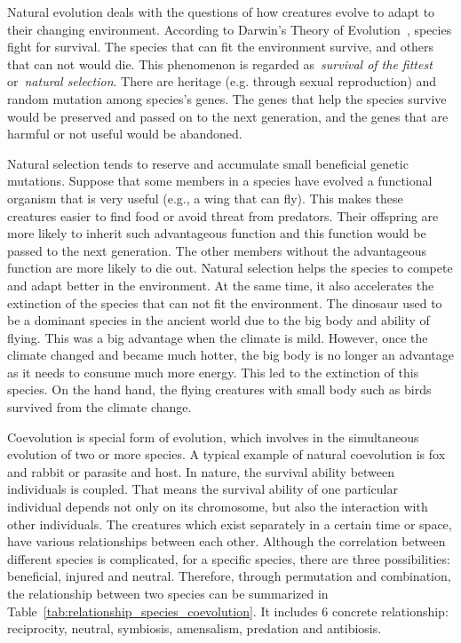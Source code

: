 Natural evolution deals with the questions of how creatures evolve to adapt to their changing environment. According to Darwin's Theory of Evolution~\cite{Darwin_1859}, species fight for survival. The species that can fit the environment survive, and others that can not would die. This phenomenon is regarded as~\textit{survival of the fittest} or~\textit{natural selection}. There are heritage (e.g. through sexual reproduction) and random mutation among species's genes. The genes that help the species survive would be preserved and passed on to the next generation, and the genes that are harmful or not useful would be abandoned. %

Natural selection tends to reserve and accumulate small beneficial genetic mutations. Suppose that some members in a species have evolved a functional organism that is very useful (e.g., a wing that can fly). This makes these creatures easier to find food or avoid threat from predators. Their offspring are more likely to inherit such advantageous function and this function would be passed to the next generation. The other members without the advantageous function are more likely to die out. Natural selection helps the species to compete and adapt better in the environment. At the same time, it also accelerates the extinction of the species that can not fit the environment. The dinosaur used to be a dominant species in the ancient world due to the big body and ability of flying. This was a big advantage when the climate is mild. However, once the climate changed and became much hotter, the big body is no longer an advantage as it needs to consume much more energy. This led to the extinction of this species. On the hand hand, the flying creatures with small body such as birds survived from the climate change. 


Coevolution is special form of evolution, which involves in the simultaneous evolution of two or more species. A typical example of natural coevolution is fox and rabbit or parasite and host. In nature, the survival ability between individuals is coupled. That means the survival ability of one particular individual depends not only on its chromosome, but also the interaction with other individuals. The creatures which exist separately in a certain time or space, have various relationships between each other. Although the correlation between different species is complicated, for a specific species, there are three possibilities: beneficial, injured and neutral. Therefore, through permutation and combination, the relationship between two species can be summarized in Table~\ref{tab:relationship_species_coevolution}. It includes 6 concrete relationship: reciprocity, neutral, symbiosis, amensalism, predation and antibiosis.

